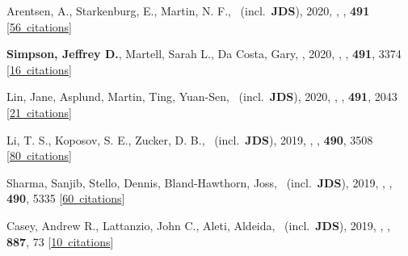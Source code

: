 \item[{\color{numcolor}\scriptsize39}] Arentsen, A., Starkenburg, E., Martin, N. F., \etal\ (incl.\ \textbf{JDS}), 2020, , \mnras, \textbf{491} [\href{https://ui.adsabs.harvard.edu/#abs/2020MNRAS.491L..11A}{56~citations}]

\item[{\color{numcolor}\scriptsize38}] \textbf{Simpson, Jeffrey D.}, Martell, Sarah L., Da Costa, Gary, \etal, 2020, , \mnras, \textbf{491}, 3374 [\href{https://ui.adsabs.harvard.edu/#abs/2020MNRAS.491.3374S}{16~citations}]

\item[{\color{numcolor}\scriptsize37}] Lin, Jane, Asplund, Martin, Ting, Yuan-Sen, \etal\ (incl.\ \textbf{JDS}), 2020, , \mnras, \textbf{491}, 2043 [\href{https://ui.adsabs.harvard.edu/#abs/2020MNRAS.491.2043L}{21~citations}]

\item[{\color{numcolor}\scriptsize36}] Li, T. S., Koposov, S. E., Zucker, D. B., \etal\ (incl.\ \textbf{JDS}), 2019, , \mnras, \textbf{490}, 3508 [\href{https://ui.adsabs.harvard.edu/#abs/2019MNRAS.490.3508L}{80~citations}]

\item[{\color{numcolor}\scriptsize35}] Sharma, Sanjib, Stello, Dennis, Bland-Hawthorn, Joss, \etal\ (incl.\ \textbf{JDS}), 2019, , \mnras, \textbf{490}, 5335 [\href{https://ui.adsabs.harvard.edu/#abs/2019MNRAS.490.5335S}{60~citations}]

\item[{\color{numcolor}\scriptsize34}] Casey, Andrew R., Lattanzio, John C., Aleti, Aldeida, \etal\ (incl.\ \textbf{JDS}), 2019, , \apj, \textbf{887}, 73 [\href{https://ui.adsabs.harvard.edu/#abs/2019ApJ...887...73C}{10~citations}]

